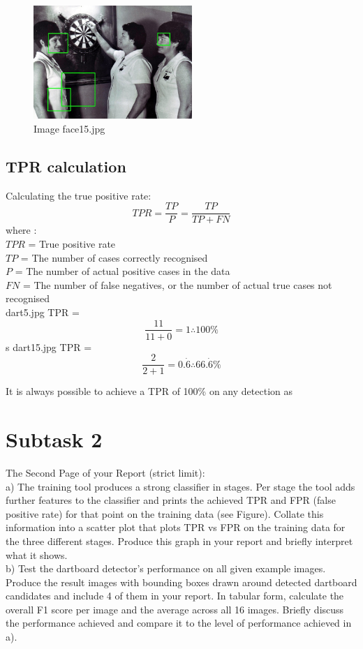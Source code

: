 \documentclass[conference]{IEEEtran}
\begin{document}
\begin{figure}[ht!]
\centering
\includegraphics[width=60mm]{img/Viola_Jones_Faces/face_detection15.jpg}
\caption{Image face15.jpg \label{img_face_15}}
\end{figure}

\subsection{TPR calculation}

Calculating the true positive rate:
\[TPR = \frac{TP}{P} = \frac{TP}{TP+FN}\]
where :\\
$TPR$ = True positive rate \\
$TP$ = The number of cases correctly recognised \\
$P$ = The number of actual positive cases in the data\\
$FN$ = The number of false negatives, or the number of actual true cases not recognised\\

dart5.jpg TPR = 
\[\frac{11}{11+0} = 1 \therefore 100\%\]s
dart15.jpg TPR = 
\[\frac{2}{2+1} = 0.\dot{6} \therefore 66.\dot{6}\%\]

It is always possible to achieve a TPR of 100\% on any detection as 

\newpage

\section{Subtask 2}

The Second Page of your Report (strict limit):\\
a) The training tool produces a strong classifier in stages. Per
stage the tool adds further features to the classifier and
prints the achieved TPR and FPR (false positive rate) for
that point on the training data (see Figure). Collate this
information into a scatter plot that plots TPR vs FPR on the
training data for the three different stages. Produce this
graph in your report and briefly interpret what it shows.\\
b) Test the dartboard detector’s performance on all given
example images. Produce the result images with bounding
boxes drawn around detected dartboard candidates and
include 4 of them in your report. In tabular form, calculate
the overall F1 score per image and the average across all
16 images. Briefly discuss the performance achieved and
compare it to the level of performance achieved in a).
\end{document}
